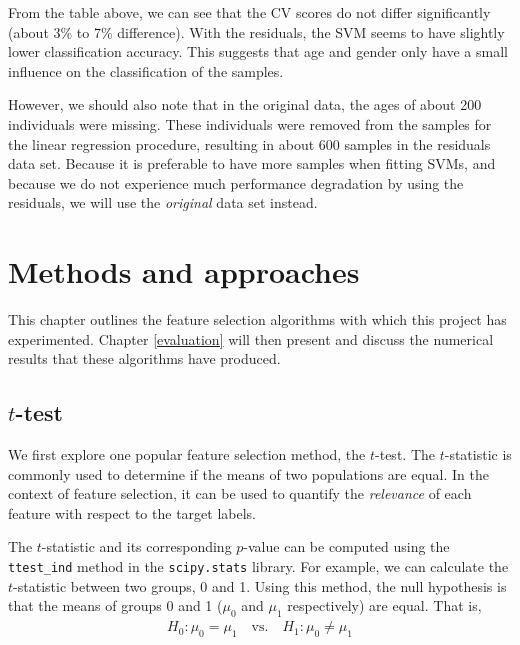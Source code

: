 \documentclass[12pt, twoside, a4paper]{report}
\begin{document}
From the table above, we can see that the CV scores do not differ significantly (about 3\% to 7\% difference). With the residuals, the SVM seems to have slightly lower classification accuracy. This suggests that age and gender only have a small influence on the classification of the samples.

However, we should also note that in the original data, the ages of about 200 individuals were missing. These individuals were removed from the samples for the linear regression procedure, resulting in about 600 samples in the residuals data set. Because it is preferable to have more samples when fitting SVMs, and because we do not experience much performance degradation by using the residuals, we will use the \textit{original} data set instead.




\chapter{Methods and approaches}
\label{methods}

This chapter outlines the feature selection algorithms with which this project has experimented. Chapter \ref{evaluation} will then present and discuss the numerical results that these algorithms have produced. 

\section{$t$-test} \label{t-test}

We first explore one popular feature selection method, the $t$-test. The $t$-statistic is commonly used to determine if the means of two populations are equal. In the context of feature selection, it can be used to quantify the \textit{relevance} of each feature with respect to the target labels.

The $t$-statistic and its corresponding $p$-value can be computed using the \texttt{ttest\_ind} method in the \texttt{scipy.stats} \cite{scipy} library. For example, we can calculate the $t$-statistic between two groups, 0 and 1. Using this method, the null hypothesis is that the means of groups 0 and 1 ($\mu_0$ and $\mu_1$ respectively) are equal. That is,
\begin{align*}
H_0: \mu_0 = \mu_1 \quad \text{vs.} \quad H_1: \mu_0 \neq \mu_1
\end{align*}
\end{document}
